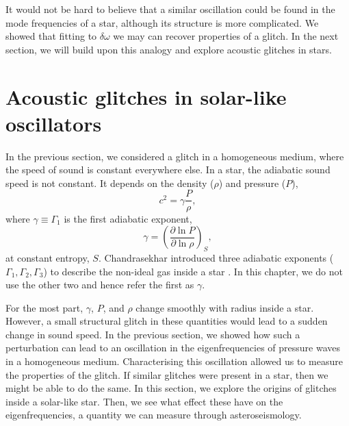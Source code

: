 

It would not be hard to believe that a similar oscillation could be found in the mode frequencies of a star, although its structure is more complicated. We showed that fitting to \(\delta\omega\) we may can recover properties of a glitch. In the next section, we will build upon this analogy and explore acoustic glitches in stars.



\section[Glitches in stars]{Acoustic glitches in solar-like oscillators}\label{sec:glitch-star}

In the previous section, we considered a glitch in a homogeneous medium, where the speed of sound is constant everywhere else. In a star, the adiabatic sound speed is not constant. It depends on the density (\(\rho\)) and pressure (\(P\)),
%
\begin{equation}
    c^2 = \gamma \frac{P}{\rho},
\end{equation}
%
where \(\gamma \equiv \Gamma_1\) is the first adiabatic exponent,
%
\begin{equation}
    \gamma = \left( \frac{\partial \ln P}{\partial \ln \rho} \right)_S,
\end{equation}
%
at constant entropy, \(S\). Chandrasekhar introduced three adiabatic exponents (\(\Gamma_1,\Gamma_2,\Gamma_3\)) to describe the non-ideal gas inside a star \needcite{}. In this chapter, we do not use the other two and hence refer the first as \(\gamma\).

For the most part, \(\gamma\), \(P\), and \(\rho\) change smoothly with radius inside a star. However, a small structural glitch in these quantities would lead to a sudden change in sound speed. In the previous section, we showed how such a perturbation can lead to an oscillation in the eigenfrequencies of pressure waves in a homogeneous medium. Characterising this oscillation allowed us to measure the properties of the glitch. If similar glitches were present in a star, then we might be able to do the same. In this section, we explore the origins of glitches inside a solar-like star. Then, we see what effect these have on the eigenfrequencies, a quantity we can measure through asteroseismology.

